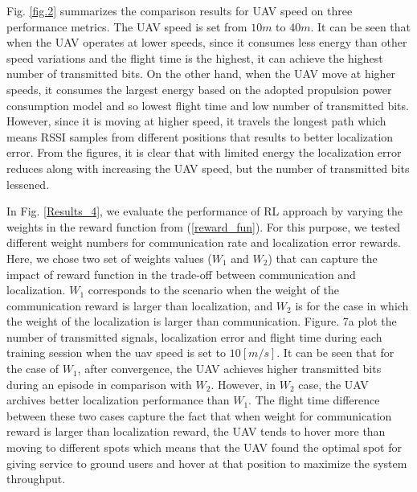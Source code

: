 \documentclass[journal,twocolumn]{IEEEtran}
\begin{document}
{%








Fig. \ref{fig.2} summarizes the comparison results for UAV speed on three performance metrics. The UAV speed is set from $10 m$ to $40 m$. It can be seen that when the UAV operates at lower speeds, since it consumes less energy than other speed variations and the flight time is the highest, it can achieve the highest number of transmitted bits. On the other hand, when the UAV move at  higher speeds, it consumes the largest energy based on the adopted propulsion power consumption model and so lowest flight time and low number of transmitted bits. However, since it is moving at higher speed, it travels the longest path which means RSSI samples from different positions that results to better localization error. From the figures, it is clear that with limited energy the localization error reduces along with increasing the UAV speed, but the number of transmitted bits lessened.




In Fig. \ref{Results_4}, we evaluate the performance of RL approach by varying the weights in the reward function from (\ref{reward_fun}). For this purpose, we tested different weight numbers for communication rate and localization error rewards. Here, we chose two set of weights values ($W_1$ and $W_2$) that can capture the impact of reward function in the trade-off between communication and localization. $W_1$ corresponds to the scenario when the weight of the communication reward is larger than localization, and $W_2$ is for the case in which the weight of the localization is larger than communication. Figure. 7a plot the number of transmitted  signals, localization error and flight time during each training session when the uav speed is set to $10 [m/s]$. It can be seen that for the case of $W_1$, after convergence, the UAV achieves higher transmitted bits during an episode in comparison with $W_2$. However, in $W_2$ case, the UAV archives better localization performance than $W_1$. The flight time difference between these two cases capture the fact that when weight for communication reward is larger than localization reward, the UAV tends to hover more than moving to different spots which means that the UAV found the optimal spot for giving service to ground users and hover at that position to maximize the system throughput.


}
\end{document}
